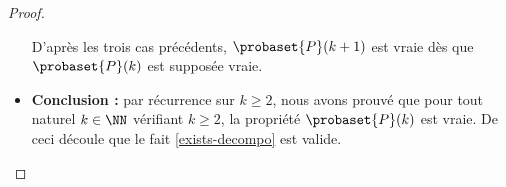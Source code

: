 \begin{proof}
\begin{itemize}[label=\small\textbullet]
		\medskip
		\noindent
		D'après les trois cas précédents, $\probaset{P}(k + 1)$ est vraie dès que $\probaset{P}(k)$ est supposée vraie.


		\medskip
		\item \textbf{Conclusion :} par récurrence sur $k \geq 2$, nous avons prouvé que pour tout naturel $k \in \NN$ vérifiant $k \geq 2$, la propriété $\probaset{P}(k)$ est vraie.
		De ceci découle que le fait \ref{exists-decompo} est valide.
	\end{itemize}
\end{proof}
